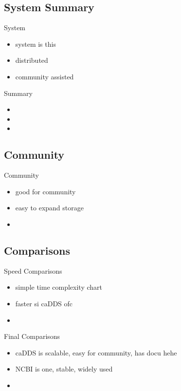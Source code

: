 \documentclass{beamer}
\begin{document}
\subsection{System Summary}
\begin{frame}{System}
  \begin{itemize}   
    \item system is this
    \item distributed
    \item community assisted
  \end{itemize}
\end{frame}

\begin{frame}{Summary}
  \begin{itemize}   
    \item 
    \item 
    \item 
  \end{itemize}
\end{frame}

\subsection{Community}
\begin{frame}{Community}
  \begin{itemize}   
    \item good for community
    \item easy to expand storage
    \item 
  \end{itemize}
\end{frame}

\subsection{Comparisons}
\begin{frame}{Speed Comparisons}
  \begin{itemize}   
    \item simple time complexity chart
    \item faster si caDDS ofc 
    \item 
  \end{itemize}
\end{frame}


\begin{frame}{Final Comparisons}
  \begin{itemize}   
    \item caDDS is scalable, easy for community, has docu hehe
    \item NCBI is one, stable, widely used
    \item 
  \end{itemize}
\end{frame}
\end{document}
